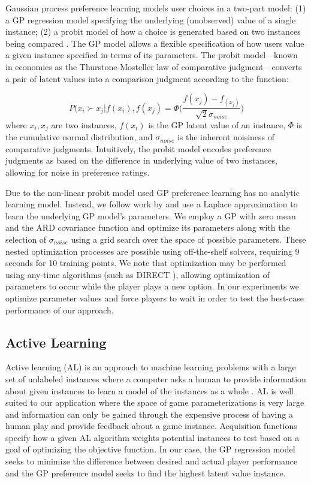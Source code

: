 \documentclass[letterpaper]{article}
\begin{document}
Gaussian process preference learning models user choices in a two-part model: (1) a GP regression model specifying the underlying  (unobserved) value of a single instance; (2) a probit model of how a choice is generated based on two instances being compared \cite{chu2005}. The GP model allows a flexible specification of how users value a given instance specified in terms of its parameters. The probit model---known in economics as the Thurstone-Mosteller law of comparative judgment---converts a pair of latent values into a comparison judgment according to the function:

$$ P( x_i \succ x_j | f(x_i), f(x_j) = \Phi\bigg( \frac{f(x_j) - f_(x_j)}{\sqrt{2} \sigma_{noise}} \bigg) $$
where $x_i, x_j$ are two instances, $f(x_i)$ is the GP latent value of an instance, $\Phi$ is the cumulative normal distribution, and $\sigma_{noise}$ is the inherent noisiness of comparative judgments. Intuitively, the probit model encodes preference judgments as based on the difference in underlying value of two instances, allowing for noise in preference ratings. 

Due to the non-linear probit model used GP preference learning has no analytic learning model. Instead, we follow work by \cite{chu2005} and use a Laplace approximation to learn the underlying GP model's parameters. We employ a GP with zero mean and the ARD covariance function and optimize its parameters along with the selection of $\sigma_{noise}$ using a grid search over the space of possible parameters. These nested optimization processes are possible using off-the-shelf solvers, requiring 9 seconds for 10 training points. 
We note that optimization may be performed using any-time algorithms (such as DIRECT \cite{jones1993:direct}), allowing optimization of parameters to occur while the player plays a new option. In our experiments we optimize parameter values and force players to wait in order to test the best-case performance of our approach.


\subsection{Active Learning}
Active learning (AL) is an approach to machine learning problems with a large set of unlabeled instances where a computer asks a human to provide information about given instances to learn a model of the instances as a whole \cite{settles2012:al-book}. AL is well suited to our application where the space of game parameterizations is very large and information can only be gained through the expensive process of having a human play and provide feedback about a game instance. Acquisition functions specify how a given AL algorithm weights potential instances to test based on a goal of optimizing the objective function. In our case, the GP regression model seeks to minimize the difference between desired and actual player performance and the GP preference model seeks to find the highest latent value instance.
\end{document}
